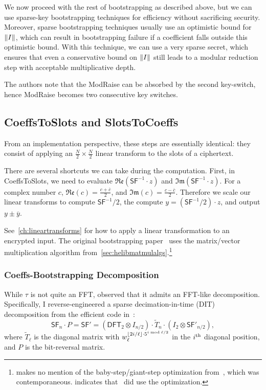 \documentclass[../fheimpl.tex]{subfiles}
\begin{document}
    We now proceed with the rest of bootstrapping as described above, but we can use sparse-key bootstrapping techniques for efficiency without sacrificing security. Moreover, sparse bootstrapping techniques usually use an optimistic bound for $\lVert I\rVert$, which can result in bootstrapping failure if a coefficient falls outside this optimistic bound. With this technique, we can use a very sparse secret, which ensures that even a conservative bound on $\lVert I\rVert$ still leads to a modular reduction step with acceptable multiplicative depth.
    
    The authors note that the ModRaise can be absorbed by the second key-switch, hence ModRaise becomes two consecutive key switches.
	
    \subsection{CoeffsToSlots and SlotsToCoeffs}
    From an implementation perspective, these steps are essentially identical: they consist of applying an $\frac{N}{2}\times \frac{N}{2}$ linear transform to the slots of a ciphertext.
    
    There are several shortcuts we can take during the computation. First, in CoeffsToSlots, we need to evaluate $\mathfrak{Re}(\mathsf{SF}^{-1}\cdot z)$ and $ \mathfrak{Im}(\mathsf{SF}^{-1}\cdot z)$. For a complex number $c$, $\mathfrak{Re}(c) = \frac{c+\overline{c}}{2}$, and $\mathfrak{Im}(c) = \frac{c-\overline{c}}{2}$. Therefore we scale our linear transforms to compute $\mathsf{SF}^{-1} / 2$, the compute $y =(\mathsf{SF}^{-1}/2)\cdot z$, and output $y\pm \overline{y}$.
        
    See~\cref{ch:lineartransforms} for how to apply a linear transformation to an encrypted input. The original bootstrapping paper~\cite{cryptoeprint:2018/153} uses the matrix/vector multiplication algorithm from~\cref{sec:helibmatmulalgs}.\footnote{\cite{cryptoeprint:2018/153} makes no mention of the baby-step/giant-step optimization from~\cite{cryptoeprint:2018/244}, which was contemporaneous. \cite{cryptoeprint:2018/1043} indicates that~\cite{cryptoeprint:2018/153} did use the optimization.}
    
    \subsubsection{Coeffs-Bootstrapping Decomposition}
    \label{sec:bts-s2c-decomp}
    While $\tau$ is not quite an FFT, \cite{cryptoeprint:2018/1043, cryptoeprint:2018/1073} observed that it admits an FFT-like decomposition. Specifically, I reverse-engineered a sparse decimation-in-time (DIT) decomposition from the efficient code in~\cite{cryptoeprint:2018/1073}:
    \[\mathsf{SF}_n\cdot P = \mathsf{SF}' = (\mathsf{DFT}_2\otimes I_{n/2})\cdot \tilde{T}_n\cdot(I_2\otimes \mathsf{SF}'_{n/2}),\]
    where $\tilde{T}_\ell$ is the diagonal matrix with $w_\ell^{\lfloor2i / \ell\rfloor\cdot 5^{i\bmod \ell/2}}$ in the $i^{\mathrm{th}}$ diagonal position, and $P$ is the bit-reversal matrix.
    
\end{document}
